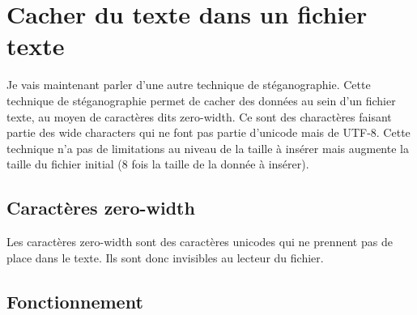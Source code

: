 \newpage
\section{Cacher du texte dans un fichier texte}
Je vais maintenant parler d'une autre technique de stéganographie. Cette technique de stéganographie permet de cacher des données au sein d'un fichier texte, au moyen de caractères dits zero-width. Ce sont des charactères faisant partie des wide characters qui ne font pas partie d'unicode mais de UTF-8.
\newline
Cette technique n'a pas de limitations au niveau de la taille à insérer mais augmente la taille du fichier initial (8 fois la taille de la donnée à insérer).
\subsection{Caractères zero-width}
Les caractères zero-width sont des caractères unicodes qui ne prennent pas de place dans le texte. Ils sont donc invisibles au lecteur du fichier.
\subsection{Fonctionnement}
